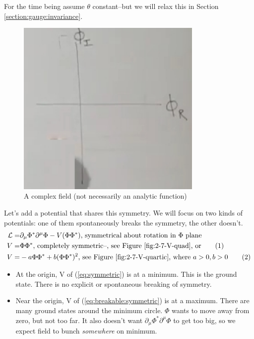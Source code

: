 \documentclass[]{article}
\newcommand\numberthis{\addtocounter{equation}{1}\tag{\theequation}}
\begin{document}
For the time being assume $\theta$ constant--but we will relax this in Section \ref{section:gauge:invariance}.

\begin{figure}[H]
	\caption{A complex field (not necessarily an analytic function)}\label{fig:2-7-complex-phi}
	\includegraphics[width=0.8\textwidth]{2-7-complex-phi}
\end{figure}

Let's add a potential that shares this symmetry. We will focus on two kinds of potentials: one of them spontaneously breaks the symmetry, the other doesn't.
\begin{align*}
\mathcal{L} =&  \partial_\mu \Phi^* \partial^\mu \Phi -V(\Phi \Phi^*) \text{, symmetrical about rotation in $\Phi$ plane}\\
V =& \Phi \Phi^* \text{, completely symmetric--\text{, see Figure \ref{fig:2-7-V-quad}}, or} \numberthis \label{eq:symmetric}\\
V=& -a \Phi \Phi^* + b (\Phi \Phi^*)^2 \text{, see Figure \ref{fig:2-7-V-quartic}} \text{, where $a>0,b>0$}\numberthis \label{eq:breakable:symmetric}
\end{align*}

\begin{itemize}
	\item At the origin, V of (\ref{eq:symmetric}) is at a minimum. This is the ground state. There is no explicit or spontaneous breaking of symmetry.
	\item Near the origin, V of (\ref{eq:breakable:symmetric}) is at a maximum. There are many ground states around the minimum circle. $\Phi$ wants to move away from zero, but not too far. It also doesn't want $\partial_\mu \Phi^* \partial^\mu \Phi$ to get too big, so we expect field to bunch \emph{somewhere} on minimum.
\end{itemize}
\end{document}
